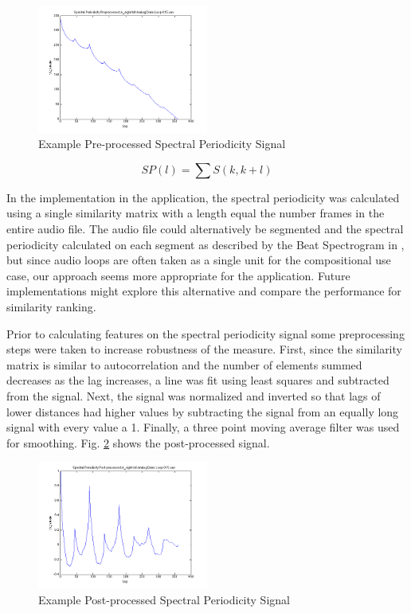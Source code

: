\documentclass{article}
\begin{document}
\begin{figure}[h!]
	
  \centering
    \includegraphics[width=0.5\textwidth]{bs_pre.png}
      \caption{Example Pre-processed Spectral Periodicity Signal}\label{fig:bs1_pre}
\end{figure}

\begin{equation}
\label{eq:bs}
SP(l) = \sum S(k, k+l)
\end{equation}

In the implementation in the application, the spectral periodicity was calculated using a single similarity matrix with a length equal the number frames in the entire audio file. The audio file could alternatively be segmented and the spectral periodicity calculated on each segment as described by the Beat Spectrogram in \cite{foote2001beat}, but since audio loops are often taken as a single unit for the compositional use case, our approach seems more appropriate for the application. Future implementations might explore this alternative and compare the performance for similarity ranking.

Prior to calculating features on the spectral periodicity signal some preprocessing steps were taken to increase robustness of the measure. First, since the similarity matrix is similar to autocorrelation and the number of elements summed decreases as the lag increases, a line was fit using least squares and subtracted from the signal. Next, the signal was normalized and inverted so that lags of lower distances had higher values by subtracting the signal from an equally long signal with every value a 1. Finally, a three point moving average filter was used for smoothing. Fig. \ref{fig:bs1_post} shows the post-processed signal.

\begin{figure}[h!]
  \centering
    \includegraphics[width=0.5\textwidth]{bs_post.png}
      \caption{Example Post-processed Spectral Periodicity Signal}	\label{fig:bs1_post}
\end{figure}
\end{document}
